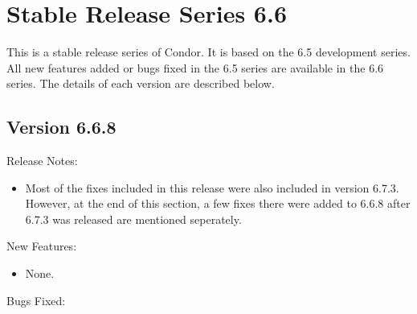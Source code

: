 \section{\label{sec:History-6-6}Stable Release Series 6.6}

This is a stable release series of Condor.
It is based on the 6.5 development series.
All new features added or bugs fixed in the 6.5 series are available
in the 6.6 series.
The details of each version are described below.

\subsection{\label{sec:New-6-6-8}Version 6.6.8}

\noindent Release Notes:

\begin{itemize}

\item Most of the fixes included in this release were also included in
  version 6.7.3.
  However, at the end of this section, a few fixes there were added to
  6.6.8 after 6.7.3 was released are mentioned seperately.

\end{itemize}


\noindent New Features:

\begin{itemize}

\item None.

\end{itemize}

\noindent Bugs Fixed:

